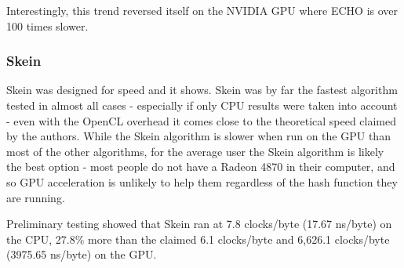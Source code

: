 Interestingly, this trend reversed itself on the NVIDIA GPU where ECHO is over 100 times slower.

\subsubsection*{Skein}
Skein was designed for speed and it shows.
Skein was by far the fastest algorithm tested in almost all cases - especially if only CPU results were taken into account - even with the OpenCL overhead it comes close to the theoretical speed claimed by the authors.
While the Skein algorithm is slower when run on the GPU than most of the other algorithms, for the average user the Skein algorithm is likely the best option - most people do not have a Radeon 4870 in their computer, and so GPU acceleration is unlikely to help them regardless of the hash function they are running.

Preliminary testing showed that Skein ran at 7.8 clocks/byte (17.67 ns/byte) on the CPU, 27.8\% more than the claimed 6.1 clocks/byte and 6,626.1 clocks/byte (3975.65 ns/byte) on the GPU.